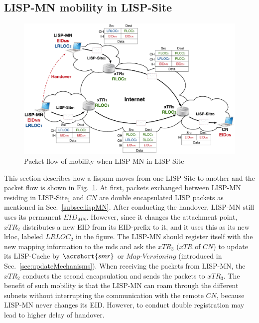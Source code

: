 \subsection{LISP-MN mobility in LISP-Site}
\label{subsec:lispMN_LS}
\begin{figure}[!t]
	\centering
	\includegraphics[width=\textwidth]{Pics/LISP-MN_in_LISP-Site.eps}
	\caption{Packet flow of mobility when LISP-MN in LISP-Site}
	\label{LISP-MN_in_LISP-Site}
\end{figure}

This section describes how a \acrshort{lispmn} moves from one LISP-Site to another and the packet flow is shown in Fig.~\ref{LISP-MN_in_LISP-Site}. At first, packets exchanged between $\text{LISP-MN}$ residing in $\text{LISP-Site}_1$ and $CN$ are double encapsulated LISP packets as mentioned in Sec.~\ref{subsec:lispMN}. After conducting the handover, $\text{LISP-MN}$ still uses its permanent $EID_{MN}$. However, since it changes the attachment point, $xTR_2$ distributes a new EID from its EID-prefix to it, and it uses this as its new \acrshort{lrloc}, labeled $LRLOC_2$ in the figure. The $\text{LISP-MN}$ should register itself with the new mapping information to the \acrshort{mds} and ask the ${xTR_3}$ ($xTR$ of $CN$) to update its LISP-Cache by $\acrshort{smr}$ or $Map\textbf{-}Versioning$ (introduced in Sec.~\ref{sec:updateMechanisms}). When receiving the packets from $\text{LISP-MN}$, the $xTR_2$ conducts the second encapsulation and sends the packets to $xTR_3$. The benefit of such mobility is that the $\text{LISP-MN}$ can roam through the different subnets without interrupting the communication with the remote $CN$, because $\text{LISP-MN}$ never changes its EID. However, to conduct double registration may lead to higher delay of handover.

